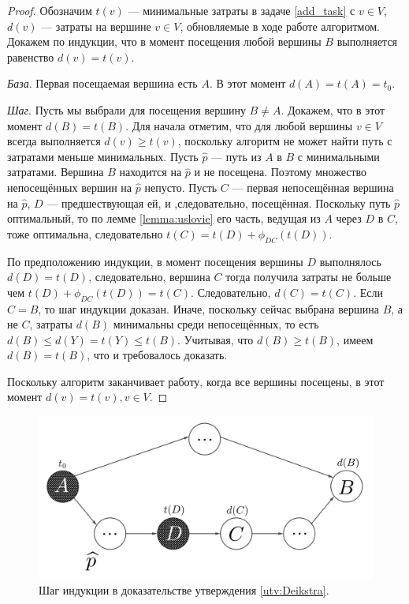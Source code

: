 \documentclass[12pt, a4paper]{article}
\begin{document}
	\begin{proof}
		Обозначим $t(v)$ --- минимальные затраты в задаче \eqref{add_task} с $v \in V$, $d(v)$ --- затраты на вершине $v \in V$, обновляемые в ходе работе алгоритмом. Докажем по индукции, что в момент посещения любой вершины $B$ выполняется равенство  $d(v) = t(v)$.
		
		\textit{База}. Первая посещаемая вершина есть $A$. В этот момент $d(A) = t(A) = t_0$.
		
		\textit{Шаг}. Пусть мы выбрали для посещения вершину $B \ne A$. Докажем, что в этот момент $d(B) = t(B)$. Для начала отметим, что для любой вершины $v \in V$ всегда выполняется $d(v)\ge t(v)$, поскольку алгоритм не может найти путь с затратами меньше минимальных. Пусть $\widehat{p}$ — путь из $A$ в $B$ с минимальными затратами.
		Вершина $B$ находится на $\widehat{p}$ и не посещена. Поэтому множество непосещённых вершин на $\widehat{p}$ непусто. Пусть $C$ --- первая непосещённая вершина на $\widehat{p}$, $D$ --- предшествующая ей, и ,следовательно, посещённая. Поскольку путь $\widehat{p}$ оптимальный, то по лемме \ref{lemma:uslovie} его часть, ведущая из $A$ через $D$ в $C$, тоже оптимальна, следовательно $t(C) = t(D) + \phi_{DC}(t(D))$.

		По предположению индукции, в момент посещения вершины $D$ выполнялось $d(D) = t(D)$, следовательно, вершина $C$ тогда получила затраты не больше чем $t(D) + \phi_{DC}(t(D)) = t(C)$. Следовательно, $d(C) = t(C)$. Если $C = B$, то шаг индукции доказан. Иначе, поскольку сейчас выбрана вершина $B$, а не $C$, затраты $d(B)$ минимальны среди непосещённых, то есть $d(B) \le d(Y) = t(Y) \le t(B)$. Учитывая, что $d(B) \ge t(B)$, имеем $d(B) = t(B)$, что и требовалось доказать.
		
		Поскольку алгоритм заканчивает работу, когда все вершины посещены, в этот момент $d(v) = t(v), v \in V$.
	\end{proof}
	\begin{figure}[H]
	\centering
	\includegraphics[scale=0.25]{Deikstra.png}
	\caption{Шаг индукции в доказательстве утверждения \ref{utv:Deikstra}.}
	\label{ris:Deikstra-graph}
	\end{figure}
\end{document}
